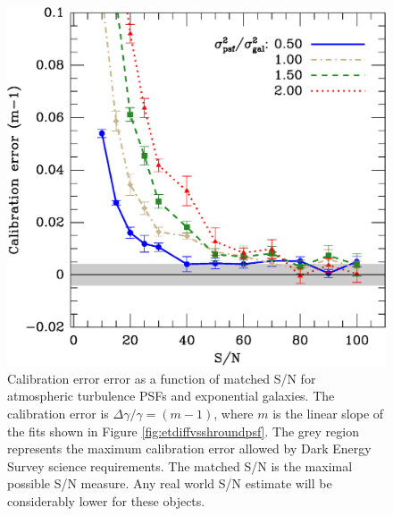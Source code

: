 \documentclass[10pt,preprint]{aastex}
\newcommand{\psf}{PSF}
\begin{document}
\begin{figure}[t] \centering
 \centering 
 \includegraphics[scale=0.65]{figures/set-s2n-et03-m-vs-shear.eps}

 \caption{Calibration error error as a function of matched S/N for atmospheric
 turbulence  \psf s and exponential galaxies.  The calibration error is
 $\Delta \gamma/\gamma = (m-1)$, where $m$ is the linear slope of the fits shown in
 Figure \ref{fig:etdiffvsshroundpsf}.  The grey region represents the 
 maximum calibration error allowed by Dark Energy Survey science
 requirements.  The matched S/N is the maximal possible S/N measure.  Any real
 world S/N estimate will be considerably lower for these objects.} 

 \label{fig:etcaliberr}

\end{figure}
\end{document}
